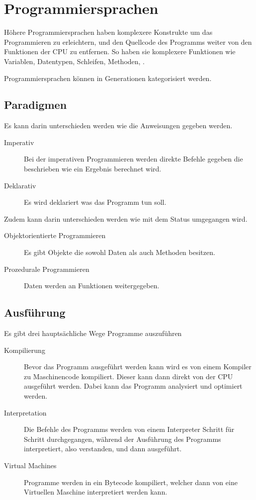 \documentclass{article}
\begin{document}
\section{Programmiersprachen} 
Höhere Programmiersprachen haben komplexere Konstrukte um das Programmieren zu erleichtern, und den Quellcode des Programms weiter von den Funktionen der CPU zu entfernen. So haben sie komplexere Funktionen wie Variablen, Datentypen, Schleifen, Methoden, \usw.

Programmiersprachen können in Generationen kategorisiert werden.

\subsection{Paradigmen}
Es kann darin unterschieden werden wie die Anweisungen gegeben werden.
\begin{description}
 \item[Imperativ] Bei der imperativen Programmieren werden direkte Befehle gegeben die beschrieben wie ein Ergebnis berechnet wird.
 \item[Deklarativ] Es wird deklariert was das Programm tun soll.
\end{description}
Zudem kann darin unterschieden werden wie mit dem Status umgegangen wird.
\begin{description}
 \item[Objektorientierte Programmieren] Es gibt Objekte die sowohl Daten als auch Methoden besitzen.
 \item[Prozedurale Programmieren] Daten werden an Funktionen weitergegeben.
\end{description}

\subsection{Ausführung}
Es gibt drei hauptsächliche Wege Programme auszuführen
\begin{description}
 \item[Kompilierung] Bevor das Programm ausgeführt werden kann wird es von einem Kompiler zu Maschinencode kompiliert. Dieser kann dann direkt von der CPU ausgeführt werden. Dabei kann das Programm analysiert und optimiert werden.
 \item[Interpretation] Die Befehle des Programms werden von einem Interpreter Schritt für Schritt durchgegangen, während der Ausführung des Programms interpretiert, also verstanden, und dann ausgeführt.
 \item[Virtual Machines] Programme werden in ein Bytecode kompiliert, welcher dann von eine Virtuellen Maschine interpretiert werden kann.
\end{description}
\end{document}
